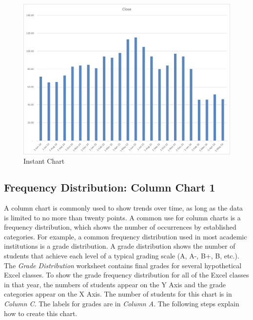 \begin{figure}[H]
	\centering
	\includegraphics[width=\maxwidth{.95\linewidth}]{gfx/ch04_fig12}
	\caption{Instant Chart}
	\label{04:fig12}
\end{figure}

\subsection{Frequency Distribution: Column Chart 1}

A column chart is commonly used to show trends over time, as long as the data is limited to no more than twenty points. A common use for column charts is a frequency distribution, which shows the number of occurrences by established categories. For example, a common frequency distribution used in most academic institutions is a grade distribution. A grade distribution shows the number of students that achieve each level of a typical grading scale (A, A-, B+, B, etc.). The \textit{Grade Distribution} worksheet contains final grades for several hypothetical Excel classes. To show the grade frequency distribution for all of the Excel classes in that year, the numbers of students appear on the Y Axis and the grade categories appear on the X Axis. The number of students for this chart is in \textit{Column C}. The labels for grades are in \textit{Column A}. The following steps explain how to create this chart.

